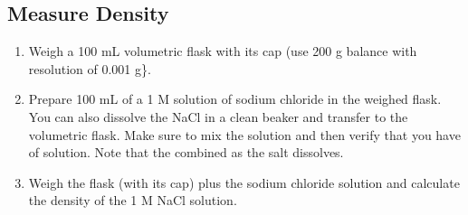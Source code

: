 \documentclass[letterpaper,10pt,english]{sphinxmanual}
\begin{document}
\subsection{Measure Density}
\label{\detokenize{Laboratory_Measurements/Laboratory_Measurements:measure-density}}\begin{enumerate}
\item {} 
Weigh a 100 mL volumetric flask with its cap (use 200 g balance with resolution of 0.001 g\}.

\item {} 
Prepare 100 mL of a 1 M solution of sodium chloride in the weighed flask. You can also dissolve the NaCl in a clean beaker and transfer to the volumetric flask.  Make sure to mix the solution and then verify that you have  of solution. Note that the combined  as the salt dissolves.

\item {} 
Weigh the flask (with its cap) plus the sodium chloride solution and calculate the density of the 1 M NaCl solution.

\end{enumerate}

%
\begin{sphinxVerbatim}[commandchars=\\\{\}]
     
   
   
   

  
  
   
 
\end{sphinxVerbatim}
\end{document}
